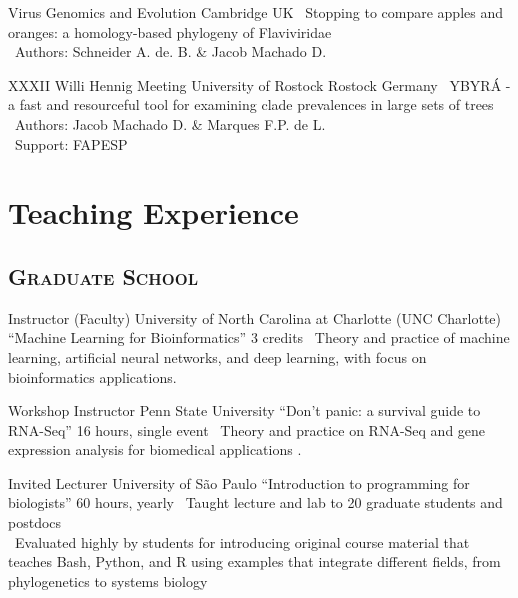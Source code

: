 \documentclass[11pt, letterpaper, sans]{moderncv}
\begin{document}
\vspace{.5em}

	{Virus Genomics and Evolution}
	{Cambridge}
	{UK}
	{}
	{
		\textbullet~Stopping to compare apples and oranges: a homology-based phylogeny of Flaviviridae \\
		\textbullet~Authors: Schneider A. de. B. \& Jacob Machado D.
}

\vspace{.5em}

	{XXXII Willi Hennig Meeting}
	{University of Rostock}
	{Rostock}
	{Germany}
	{
		\textbullet~YBYRÁ - a fast and resourceful tool for examining clade prevalences in large sets of trees\\
		\textbullet~Authors: Jacob Machado D. \& Marques F.P. de L.\\
		\textbullet~Support: FAPESP
}

\section{Teaching Experience}

\vspace{.5em}
	\subsection{\textsc{Graduate School}}
\vspace{.5em}

	{Instructor (Faculty)}
	{University of North Carolina at Charlotte (UNC Charlotte)}
	{``Machine Learning for Bioinformatics''}
	{3 credits}
	{
		\textbullet~Theory and practice of machine learning, artificial neural networks, and deep learning, with focus on bioinformatics applications.
	}

	{Workshop Instructor}
	{Penn State University}
	{``Don't panic: a survival guide to RNA-Seq''}
	{16 hours, single event}
	{
		\textbullet~Theory and practice on RNA-Seq and gene expression analysis for biomedical applications .
	}

	{Invited Lecturer}
	{University of São Paulo}
	{``Introduction to programming for biologists''}
	{60 hours, yearly}
	{
		\textbullet~Taught lecture and lab to 20 graduate students and postdocs\\
		\textbullet~Evaluated highly by students for introducing original course material that teaches Bash, Python, and R using examples that integrate different fields, from phylogenetics to systems biology
	}
\end{document}
